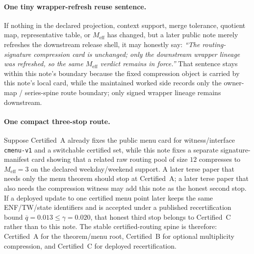 \documentclass[11pt]{article}
\begin{document}
\paragraph{One tiny wrapper-refresh reuse sentence.}
If nothing in the declared projection, context support, merge tolerance, quotient map, representative table, or $M_{\mathrm{eff}}$ has changed, but a later public note merely refreshes the downstream release shell, it may honestly say: \emph{``The routing-signature compression card is unchanged; only the downstream wrapper lineage was refreshed, so the same $M_{\mathrm{eff}}$ verdict remains in force.''}
That sentence stays within this note's boundary because the fixed compression object is carried by this note's local card, while the maintained worked side records only the owner-map / series-spine route boundary; only signed wrapper lineage remains downstream.\cite{series:abomoinl,series:releaseA,series:workedexample}

\paragraph{One compact three-stop route.}
Suppose Certified~A already fixes the public menu card for witness/interface \texttt{cmenu-v1} and a switchable certified set, while this note fixes a separate signature-manifest card showing that a related raw routing pool of size $12$ compresses to $M_{\mathrm{eff}}=3$ on the declared weekday/weekend support.
A later terse paper that needs only the menu theorem should stop at Certified~A; a later terse paper that also needs the compression witness may add this note as the honest second stop.
If a deployed update to one certified menu point later keeps the same ENF/TW/state identifiers and is accepted under a published recertification bound $\overline q=0.013\le \gamma=0.020$, that honest third stop belongs to Certified~C rather than to this note.
The stable certified-routing spine is therefore: Certified~A for the theorem/menu root, Certified~B for optional multiplicity compression, and Certified~C for deployed recertification.\cite{series:certifiedmenus,series:recert}
\end{document}
